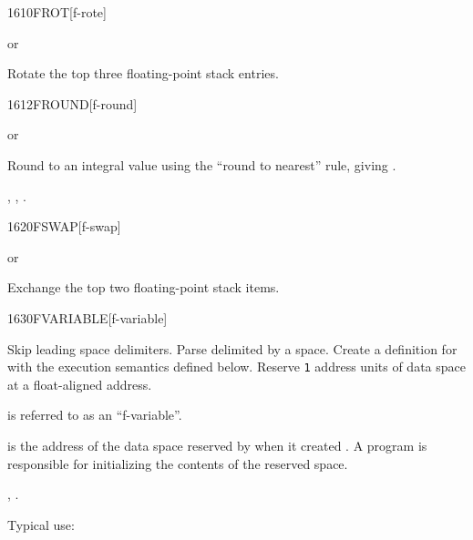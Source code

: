 \begin{worddef}{1610}{FROT}[f-rote]
\item {} or

	Rotate the top three floating-point stack entries.
\end{worddef}


\begin{worddef}{1612}{FROUND}[f-round]
\item {} or

	Round  to an integral value using the ``round to nearest''
	rule, giving .

\see {},
	, .
\end{worddef}


\begin{worddef}{1620}{FSWAP}[f-swap]
\item {} or

	Exchange the top two floating-point stack items.
\end{worddef}


\begin{worddef}{1630}{FVARIABLE}[f-variable]
\item {}

	Skip leading space delimiters. Parse  delimited by a
	space. Create a definition for  with the execution
	semantics defined below. Reserve \texttt{1} 
	address units of data space at a float-aligned address.

	 is referred to as an ``f-variable''.

\execute[name]

	 is the address of the data space reserved by
	 when it created . A program is
	responsible for initializing the contents of the reserved
	space.

\see {},
	.

	\begin{rationale} %
		Typical use:
			 
	\end{rationale}
\end{worddef}


